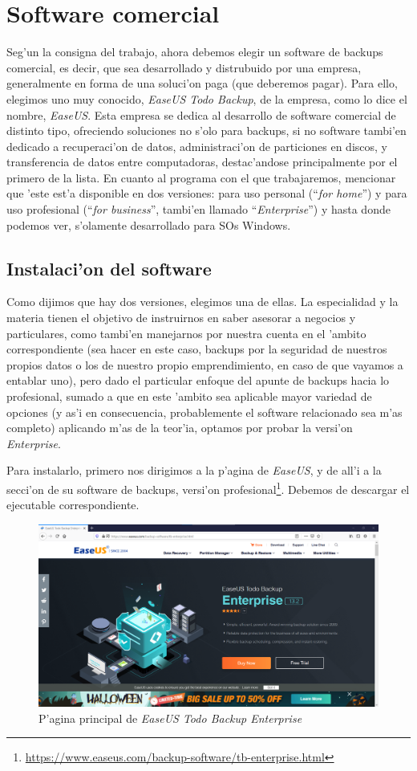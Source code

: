 \documentclass[11pt]{article}
\begin{document}
	\section{Software comercial}
		Seg'un la consigna del trabajo, ahora debemos elegir un software de backups comercial, es decir, que sea desarrollado y distrubuido por una empresa, generalmente en forma de una soluci'on paga (que deberemos pagar). Para ello, elegimos uno muy conocido, \textit{EaseUS Todo Backup}, de la empresa, como lo dice el nombre, \textit{EaseUS}. Esta empresa se dedica al desarrollo de software comercial de distinto tipo, ofreciendo soluciones no s'olo para backups, si no software tambi'en dedicado a recuperaci'on de datos, administraci'on de particiones en discos, y transferencia de datos entre computadoras, destac'andose principalmente por el primero de la lista. En cuanto al programa con el que trabajaremos, mencionar que 'este est'a disponible en dos versiones: para uso personal (``\textit{for home}'') y para uso profesional (``\textit{for business}'', tambi'en llamado ``\textit{Enterprise}'') y hasta donde podemos ver, s'olamente desarrollado para SOs Windows.
		
	\subsection{Instalaci'on del software}
		Como dijimos que hay dos versiones, elegimos una de ellas. La especialidad y la materia tienen el objetivo de instruirnos en saber asesorar a negocios y particulares, como tambi'en manejarnos por nuestra cuenta en el 'ambito correspondiente (sea hacer en este caso, backups por la seguridad de nuestros propios datos o los de nuestro propio emprendimiento, en caso de que vayamos a entablar uno), pero dado el particular enfoque del apunte de backups hacia lo profesional, sumado a que en este 'ambito sea aplicable mayor variedad de opciones (y as'i en consecuencia, probablemente el software relacionado sea m'as completo) aplicando m'as de la teor'ia, optamos por probar la versi'on \textit{Enterprise}.

		Para instalarlo, primero nos dirigimos a la p'agina de \textit{EaseUS}, y de all'i a la secci'on de su software de backups, versi'on profesional\footnote{\url{https://www.easeus.com/backup-software/tb-enterprise.html}}. Debemos de descargar el ejecutable correspondiente.
		
		\begin{figure}[H]
			\centering
			\includegraphics[width=.8\textwidth]{Images/easeus/website}
			\caption{P'agina principal de \textit{EaseUS Todo Backup Enterprise}}
		\end{figure}
\end{document}
